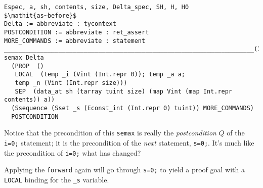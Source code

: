 \documentclass[12pt,fleqn,openany,oneside,showtrims]{memoir}
\begin{document}
\begin{lstlisting}
Espec, a, sh, contents, size, Delta_spec, SH, H, H0 $\mathit{as~before}$
Delta := abbreviate : tycontext
POSTCONDITION := abbreviate : ret_assert
MORE_COMMANDS := abbreviate : statement
_____________________________________________________________________(1/1)
semax Delta
  (PROP  ()
   LOCAL  (temp _i (Vint (Int.repr 0)); temp _a a;
   temp _n (Vint (Int.repr size)))
   SEP  (data_at sh (tarray tuint size) (map Vint (map Int.repr contents)) a))
  (Ssequence (Sset _s (Econst_int (Int.repr 0) tuint)) MORE_COMMANDS)
  POSTCONDITION
\end{lstlisting}
Notice that the precondition of this \lstinline{semax}
is really the \emph{postcondition} $Q$ of the
\lstinline{i=0;} statement; it is the precondition
of the \emph{next} statement, \lstinline{s=0;}.
It's much like the precondition of
\lstinline{i=0;} what has changed?

Applying the \lstinline{forward} again will go through
\lstinline{s=0;} to yield a proof goal
with a \lstinline{LOCAL} binding for the \lstinline{_s}
variable.
\end{document}
